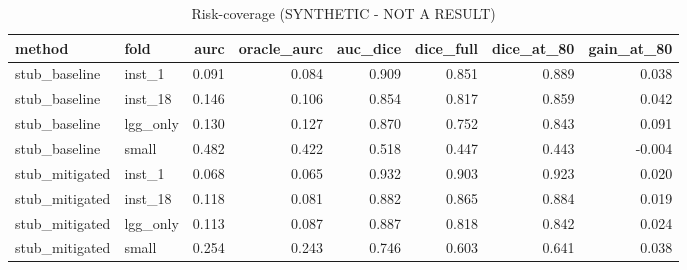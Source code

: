 \begin{table}[t]
\centering
\caption{Risk-coverage (SYNTHETIC - NOT A RESULT)}
\label{tab:rc}
\begin{tabular}{llrrrrrr}
\hline
method & fold & aurc & oracle\_aurc & auc\_dice & dice\_full & dice\_at\_80 & gain\_at\_80 \\
\hline
stub\_baseline & inst\_1 & 0.091 & 0.084 & 0.909 & 0.851 & 0.889 & 0.038 \\
stub\_baseline & inst\_18 & 0.146 & 0.106 & 0.854 & 0.817 & 0.859 & 0.042 \\
stub\_baseline & lgg\_only & 0.130 & 0.127 & 0.870 & 0.752 & 0.843 & 0.091 \\
stub\_baseline & small & 0.482 & 0.422 & 0.518 & 0.447 & 0.443 & -0.004 \\
stub\_mitigated & inst\_1 & 0.068 & 0.065 & 0.932 & 0.903 & 0.923 & 0.020 \\
stub\_mitigated & inst\_18 & 0.118 & 0.081 & 0.882 & 0.865 & 0.884 & 0.019 \\
stub\_mitigated & lgg\_only & 0.113 & 0.087 & 0.887 & 0.818 & 0.842 & 0.024 \\
stub\_mitigated & small & 0.254 & 0.243 & 0.746 & 0.603 & 0.641 & 0.038 \\
\hline
\end{tabular}
\end{table}
